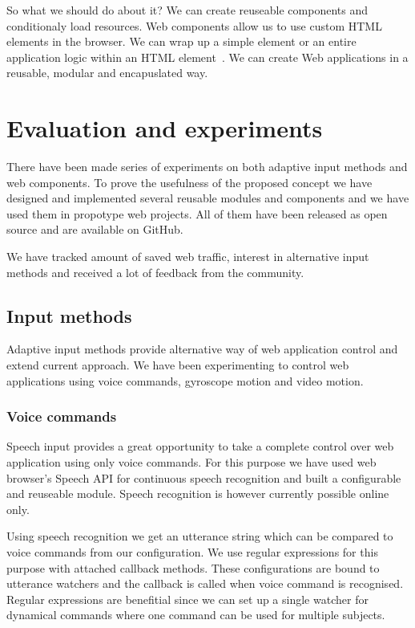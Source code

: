 \documentclass{iitsrc}
\begin{document}
So what we should do about it? We can create reuseable components and conditionaly load resources. Web components allow us to use custom HTML elements in the browser. We can wrap up a simple element or an entire application logic within an HTML element~\cite{webcomponents}. We can create Web applications in a reusable, modular and encapuslated way.


\section{Evaluation and experiments} %
\label{sec:evaluation_and_experiments}

There have been made series of experiments on both adaptive input methods and web components. To prove the usefulness of the proposed concept we have designed and implemented several reusable modules and components and we have used them in propotype web projects. All of them have been released as open source and are available on GitHub.

We have tracked amount of saved web traffic, interest in alternative input methods and received a lot of feedback from the community.

\subsection{Input methods} %
\label{sub:input_methods}

Adaptive input methods provide alternative way of web application control and extend current approach. We have been experimenting to control web applications using voice commands, gyroscope motion and video motion.

\subsubsection{Voice commands} %
\label{ssub:voice_commands}

Speech input provides a great opportunity to take a complete control over web application using only voice commands. For this purpose we have used web browser's Speech API for continuous speech recognition and built a configurable and reuseable module. Speech recognition is however currently possible online only.

Using speech recognition we get an utterance string which can be compared to voice commands from our configuration. We use regular expressions for this purpose with attached callback methods. These configurations are bound to utterance watchers and the callback is called when voice command is recognised. Regular expressions are benefitial since we can set up a single watcher for dynamical commands where one command can be used for multiple subjects.
\end{document}
